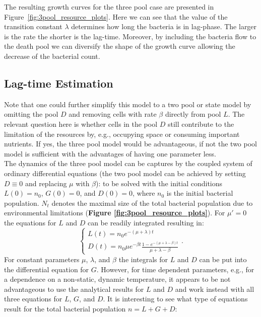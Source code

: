 \documentclass[10pt,A4paper]{article}
\begin{document}
The resulting growth curves for the three pool case are presented in Figure~\ref{fig:3pool_resource_plots}.
Here we can see that the value of the transition constant $\lambda$ determines how long the bacteria is in lag-phase.
The larger is the rate the shorter is the lag-time.
Moreover, by including the bacteria flow to the death pool we can diversify the shape of the growth curve allowing the decrease of the bacterial count.
%
%
%
\subsection{Lag-time Estimation}
Note that one could further simplify this model to a two pool or state model by omitting the pool $D$ and removing cells with rate $\beta$ directly from pool $L$. 
The relevant question here is whether cells in the pool $D$ still contribute to the limitation of the resources by, e.g., occupying space or consuming important nutrients. 
If yes, the three pool model would be advantageous, if not the two pool model is sufficient with the advantages of having one parameter less.\\
%
The dynamics of the three pool model can be captures by the coupled system of ordinary differential equations (the two pool model can be achieved by setting $D\equiv 0$ and replacing $\mu$ with $\beta$):
to be solved with the initial conditions $L(0)=n_0$, $G(0)=0$, and $D(0)=0$, where $n_0$ is the initial bacterial population. 
$N_t$ denotes the maximal size of the total bacterial population due to environmental limitations (\textbf{Figure \ref{fig:3pool_resource_plots}}). 
For $\mu'=0$ the equations for $L$ and $D$ can be readily integrated resulting in:
\begin{equation}
    \begin{cases}
        L(t) = n_0 e^{-(\mu+\lambda)t}\\
        D(t) = n_0 \mu e^{-\beta t}\frac{1-e^{-(\mu+\lambda-\beta)t}}{\mu+\lambda-\beta}
    \end{cases}.
\end{equation}
For constant parameters $\mu$, $\lambda$, and $\beta$ the integrals for $L$ and $D$ can be put into the differential equation for $G$. 
However, for time dependent parameters, e.g., for a dependence on a non-static, dynamic temperature, it appears to be not advantageous to use the analytical results for $L$ and $D$ and work instead with all three equations for $L$, $G$, and $D$. 
It is interesting to see what type of equations result for the total bacterial population $n=L+G+D$:
\end{document}
